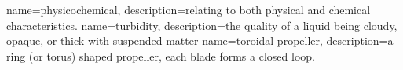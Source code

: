 {
        name=physicochemical,
        description={relating to both physical and chemical characteristics.}
}
{
        name=turbidity,
        description={the quality of a liquid being cloudy, opaque, or thick with suspended matter}
}
{
        name={toroidal propeller},
        description={a ring (or torus) shaped propeller, each blade forms a closed loop.}
}

